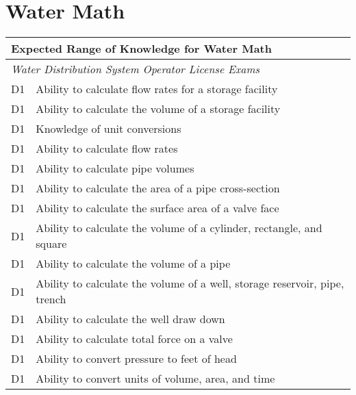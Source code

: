 \chapter{Water Math}




\begin{table}[H]
\begin{tabular}{| m{1cm} | m{15cm} |}
\hline
\multicolumn{2}{|l|}{\textbf{Expected   Range of Knowledge for Water Math}}                                                                          \\ \hline
\multicolumn{2}{|l|}{\textit{Water   Distribution System Operator License Exams}}                                                                                      \\ \hline
D1 & Ability to   calculate flow rates for a storage facility                     \\ \hline
D1 & Ability to calculate   the volume of a storage facility                      \\ \hline
D1 & Knowledge of unit   conversions                                              \\ \hline
D1 & Ability to calculate   flow rates                                            \\ \hline
D1 & Ability to calculate   pipe volumes                                          \\ \hline
D1 & Ability to calculate   the area of a pipe cross-section                      \\ \hline
D1 & Ability to calculate   the surface area of a valve face                      \\ \hline
D1 & Ability to calculate   the volume of a cylinder, rectangle, and square       \\ \hline
D1 & Ability to calculate   the volume of a pipe                                  \\ \hline
D1 & Ability to calculate   the volume of a well, storage reservoir, pipe, trench \\ \hline
D1 & Ability to calculate   the well draw down                                    \\ \hline
D1 & Ability to calculate   total force on a valve                                \\ \hline
D1 & Ability to convert   pressure to feet of head                                \\ \hline
D1 & Ability to convert   units of volume, area, and time                         \\ \hline

\end{tabular}
\end{table}
